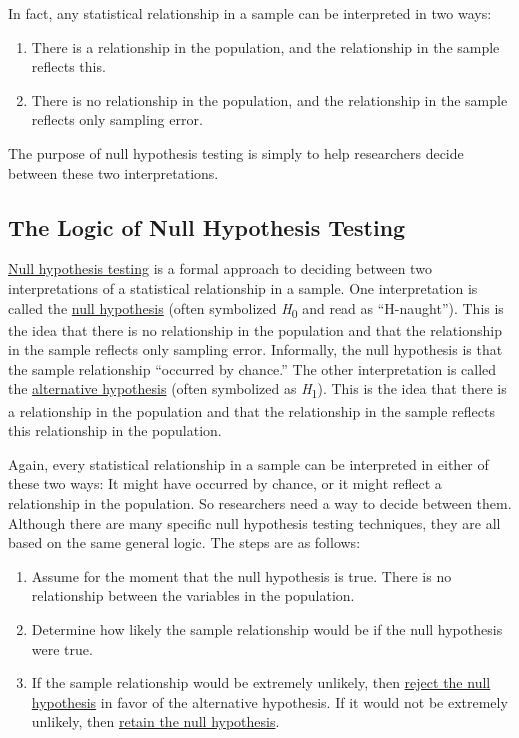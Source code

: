 \documentclass[
]{krantz}
\providecommand{\tightlist}{%
  \setlength{\itemsep}{0pt}\setlength{\parskip}{0pt}}
\begin{document}
In fact, any statistical relationship in a sample can be interpreted in two ways:

\begin{enumerate}
\def\labelenumi{\arabic{enumi}.}
\tightlist
\item
  There is a relationship in the population, and the relationship in the sample reflects this.
\item
  There is no relationship in the population, and the relationship in the sample reflects only sampling error.
\end{enumerate}

The purpose of null hypothesis testing is simply to help researchers decide between these two interpretations.

\hypertarget{the-logic-of-null-hypothesis-testing}{%
\subsection*{The Logic of Null Hypothesis Testing}\label{the-logic-of-null-hypothesis-testing}}


\protect\hyperlink{null-hypothesis-testing}{Null hypothesis testing} is a formal approach to deciding between two interpretations of a statistical relationship in a sample. One interpretation is called the \protect\hyperlink{null-hypothesis}{null hypothesis} (often symbolized \emph{H}\textsubscript{0} and read as ``H-naught''). This is the idea that there is no relationship in the population and that the relationship in the sample reflects only sampling error. Informally, the null hypothesis is that the sample relationship ``occurred by chance.'' The other interpretation is called the \protect\hyperlink{alternative-hypothesis}{alternative hypothesis} (often symbolized as \emph{H}\textsubscript{1}). This is the idea that there is a relationship in the population and that the relationship in the sample reflects this relationship in the population.

Again, every statistical relationship in a sample can be interpreted in either of these two ways: It might have occurred by chance, or it might reflect a relationship in the population. So researchers need a way to decide between them. Although there are many specific null hypothesis testing techniques, they are all based on the same general logic. The steps are as follows:

\begin{enumerate}
\def\labelenumi{\arabic{enumi}.}
\tightlist
\item
  Assume for the moment that the null hypothesis is true. There is no relationship between the variables in the population.
\item
  Determine how likely the sample relationship would be if the null hypothesis were true.
\item
  If the sample relationship would be extremely unlikely, then \protect\hyperlink{reject-the-null-hypothesis}{reject the null hypothesis} in favor of the alternative hypothesis. If it would not be extremely unlikely, then \protect\hyperlink{retain-the-null-hypothesis}{retain the null hypothesis}.
\end{enumerate}
\end{document}
